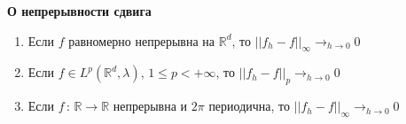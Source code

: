 \begin{theorem}
    \textbf{О непрерывности сдвига}

    \begin{enumerate}
        \item {
            Если $f$ равномерно непрерывна на $\mathbb{R}^d$, то $||f_h - f||_{\infty} \rightarrow_{h \to 0} 0$
        }
        \item {
            Если $f \in L^p (\mathbb{R}^d, \lambda)$, $1 \leqslant p < +\infty$, то $||f_h - f||_p \rightarrow_{h \to 0} 0$
        }
        \item {
            Если $f \, : \, \mathbb{R} \to \mathbb{R}$ непрерывна и $2\pi$ периодична, то $||f_h - f||_{\infty} \rightarrow_{h \to 0} 0$
        }
    \end{enumerate}
\end{theorem}

